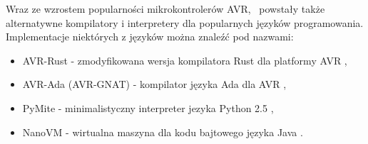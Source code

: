 Wraz ze wzrostem popularności mikrokontrolerów AVR, \nocomma\ powstały także alternatywne kompilatory i interpretery dla popularnych języków programowania. Implementacje niektórych z języków można znaleźć pod nazwami:
\begin{itemize}
\item AVR-Rust - \ksremark{--} zmodyfikowana wersja kompilatora Rust dla platformy AVR \cytowanie,
\item AVR-Ada (AVR-GNAT) - kompilator języka Ada dla AVR \cytowanie,
\item PyMite - minimalistyczny interpreter jezyka Python 2.5 \cytowanie,
\item NanoVM - wirtualna maszyna dla kodu bajtowego języka Java \cytowanie.
\end{itemize}


%
%
%




